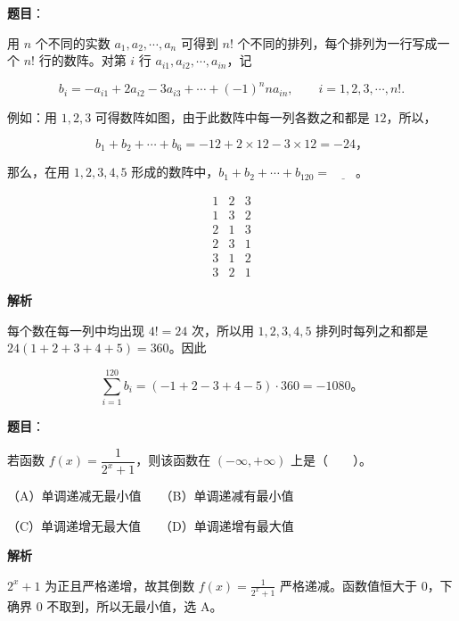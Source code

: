 \begin{answer}

\textbf{题目}：

用 $n$ 个不同的实数 $a_1,a_2,\cdots,a_n$ 可得到 $n!$ 个不同的排列，每个排列为一行写成一个 $n!$ 行的数阵。对第 $i$ 行 $a_{i1},a_{i2},\cdots,a_{in}$，记

\nopagebreak[4]
\[
b_i=-a_{i1}+2a_{i2}-3a_{i3}+\cdots+(-1)^nna_{in},\qquad i=1,2,3,\cdots,n!.
\]

例如：用 $1,2,3$ 可得数阵如图，由于此数阵中每一列各数之和都是 $12$，所以，

\nopagebreak[4]
\[
b_1+b_2+\cdots+b_6=-12+2\times12-3\times12=-24\text{，}
\]

那么，在用 $1,2,3,4,5$ 形成的数阵中，$b_1+b_2+\cdots+b_{120}=\underline{\qquad}$。

\nopagebreak[4]
\[
\begin{array}{ccc}
1&2&3\\
1&3&2\\
2&1&3\\
2&3&1\\
3&1&2\\
3&2&1
\end{array}
\]

\textbf{解析}

每个数在每一列中均出现 $4!=24$ 次，所以用 $1,2,3,4,5$ 排列时每列之和都是 $24(1+2+3+4+5)=360$。因此

\nopagebreak[4]
\[
\sum_{i=1}^{120}b_i=(-1+2-3+4-5)\cdot360=-1080\mbox{。}
\]


\end{answer}
\begin{answer}

\textbf{题目}：

若函数 $f(x)=\dfrac{1}{2^x+1}$，则该函数在 $(-\infty,+\infty)$ 上是\mbox{（　　）}。

（A）单调递减无最小值　　（B）单调递减有最小值

（C）单调递增无最大值　　（D）单调递增有最大值

\textbf{解析}

$2^x+1$ 为正且严格递增，故其倒数 $f(x)=\frac1{2^x+1}$ 严格递减。函数值恒大于 $0$，下确界 $0$ 不取到，所以无最小值，选 A。


\end{answer}
